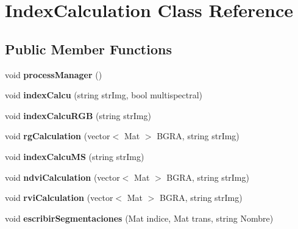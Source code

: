 \hypertarget{classIndexCalculation}{}\section{Index\+Calculation Class Reference}
\label{classIndexCalculation}
\subsection*{Public Member Functions}
\begin{DoxyCompactItemize}
\item 
\mbox{\label{classIndexCalculation_a4890d5b4758672dfba23830b59b18892}} 
void {\bfseries process\+Manager} ()
\item 
\mbox{\label{classIndexCalculation_a07039b532b218e5cfe1e603966017373}} 
void {\bfseries index\+Calcu} (string str\+Img, bool multispectral)
\item 
\mbox{\label{classIndexCalculation_a7070ce3aebd8abd71074270eff8f88b6}} 
void {\bfseries index\+Calcu\+R\+GB} (string str\+Img)
\item 
\mbox{\label{classIndexCalculation_a562111a1b8920fa0136811ecd7e51e36}} 
void {\bfseries rg\+Calculation} (vector$<$ Mat $>$ B\+G\+RA, string str\+Img)
\item 
\mbox{\label{classIndexCalculation_a9c19fb3bdd84afb8769c90a1e31857b3}} 
void {\bfseries index\+Calcu\+MS} (string str\+Img)
\item 
\mbox{\label{classIndexCalculation_a4d727b91eeb0676b3ffcfaf26ec02a32}} 
void {\bfseries ndvi\+Calculation} (vector$<$ Mat $>$ B\+G\+RA, string str\+Img)
\item 
\mbox{\label{classIndexCalculation_abd44fe3dd27ccd9641f29152fdf19a2e}} 
void {\bfseries rvi\+Calculation} (vector$<$ Mat $>$ B\+G\+RA, string str\+Img)
\item 
\mbox{\label{classIndexCalculation_ae6a53e31c25458fd8c189e21fb89d80a}} 
void {\bfseries escribir\+Segmentaciones} (Mat indice, Mat trans, string Nombre)

\end{DoxyCompactItemize}
